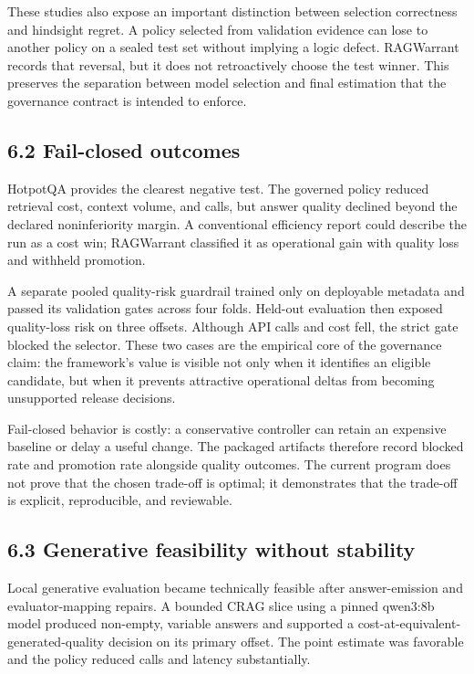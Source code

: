 \documentclass[11pt]{article}
\begin{document}
These studies also expose an important distinction between selection correctness and hindsight regret. A policy selected from validation evidence can lose to another policy on a sealed test set without implying a logic defect. RAGWarrant records that reversal, but it does not retroactively choose the test winner. This preserves the separation between model selection and final estimation that the governance contract is intended to enforce.

\subsection{6.2 Fail-closed outcomes}
HotpotQA provides the clearest negative test. The governed policy reduced retrieval cost, context volume, and calls, but answer quality declined beyond the declared noninferiority margin. A conventional efficiency report could describe the run as a cost win; RAGWarrant classified it as operational gain with quality loss and withheld promotion.

A separate pooled quality-risk guardrail trained only on deployable metadata and passed its validation gates across four folds. Held-out evaluation then exposed quality-loss risk on three offsets. Although API calls and cost fell, the strict gate blocked the selector. These two cases are the empirical core of the governance claim: the framework's value is visible not only when it identifies an eligible candidate, but when it prevents attractive operational deltas from becoming unsupported release decisions.

Fail-closed behavior is costly: a conservative controller can retain an expensive baseline or delay a useful change. The packaged artifacts therefore record blocked rate and promotion rate alongside quality outcomes. The current program does not prove that the chosen trade-off is optimal; it demonstrates that the trade-off is explicit, reproducible, and reviewable.

\subsection{6.3 Generative feasibility without stability}
Local generative evaluation became technically feasible after answer-emission and evaluator-mapping repairs. A bounded CRAG slice using a pinned qwen3:8b model produced non-empty, variable answers and supported a cost-at-equivalent-generated-quality decision on its primary offset. The point estimate was favorable and the policy reduced calls and latency substantially.
\end{document}
